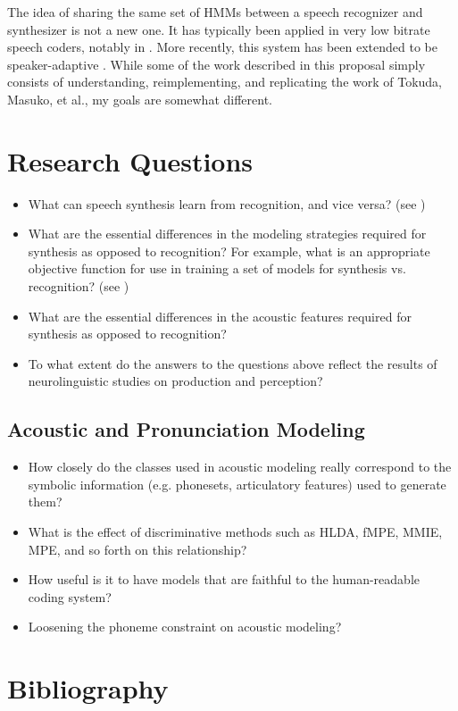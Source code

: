 \documentclass{article}
\begin{document}
The idea of sharing the same set of HMMs between a speech recognizer
and synthesizer is not a new one.  It has typically been applied in
very low bitrate speech coders, notably in \cite{Tokuda1998}.  More
recently, this system has been extended to be speaker-adaptive
\cite{Masuko2006}.  While some of the work described in this proposal
simply consists of understanding, reimplementing, and replicating the
work of Tokuda, Masuko, et al., my goals are somewhat different.

\section{Research Questions}
\label{sec:goals}

\begin{itemize}
\item What can speech synthesis learn from recognition, and vice
  versa? (see \cite{Ostendorf2002})
\item What are the essential differences in the modeling strategies
  required for synthesis as opposed to recognition?  For example, what
  is an appropriate objective function for use in training a set of
  models for synthesis vs. recognition? (see \cite{Bulyko2002})
\item What are the essential differences in the acoustic features
  required for synthesis as opposed to recognition?
\item To what extent do the answers to the questions above reflect
  the results of neurolinguistic studies on production and perception?
\end{itemize}

\subsection{Acoustic and Pronunciation Modeling}
\label{sec:am}

\begin{itemize}
\item How closely do the classes used in acoustic modeling really
  correspond to the symbolic information (e.g. phonesets, articulatory
  features) used to generate them?
\item What is the effect of discriminative methods such as HLDA, fMPE,
  MMIE, MPE, and so forth on this relationship?
\item How useful is it to have models that are faithful to the
  human-readable coding system?
\item Loosening the phoneme constraint on acoustic modeling?
\end{itemize}

\section{Bibliography}
 


\end{document}
